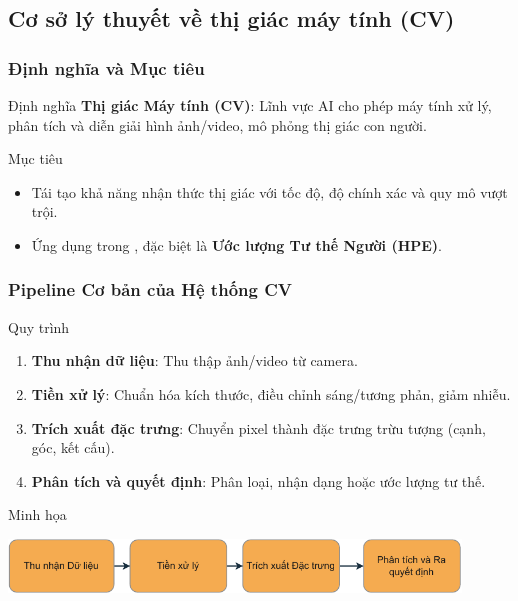 \subsection{Cơ sở lý thuyết về thị giác máy tính (CV)}
\begin{frame}
\frametitle{Định nghĩa và Mục tiêu}
\begin{block}{Định nghĩa}
\textbf{Thị giác Máy tính (CV)}: Lĩnh vực AI cho phép máy tính xử lý, phân tích và diễn giải hình ảnh/video, mô phỏng thị giác con người.
\end{block}

\begin{block}{Mục tiêu}
\begin{itemize}
\item Tái tạo khả năng nhận thức thị giác với tốc độ, độ chính xác và quy mô vượt trội.
\item Ứng dụng trong \TENLUANVAN, đặc biệt là \textbf{Ước lượng Tư thế Người (HPE)}.
\end{itemize}
\end{block}
\end{frame}

\begin{frame}
\frametitle{Pipeline Cơ bản của Hệ thống CV}
\begin{block}{Quy trình}
\begin{enumerate}
\item \textbf{Thu nhận dữ liệu}: Thu thập ảnh/video từ camera.
\item \textbf{Tiền xử lý}: Chuẩn hóa kích thước, điều chỉnh sáng/tương phản, giảm nhiễu.
\item \textbf{Trích xuất đặc trưng}: Chuyển pixel thành đặc trưng trừu tượng (cạnh, góc, kết cấu).
\item \textbf{Phân tích và quyết định}: Phân loại, nhận dạng hoặc ước lượng tư thế.
\end{enumerate}
\end{block}

\begin{exampleblock}{Minh họa}
\begin{center}
\includegraphics[width=0.9\textwidth]{images/vision_flow-crop.pdf}
\caption{Quy trình tổng thể của hệ thống CV.}
\label{fig:cv_pipeline}
\end{center}
\end{exampleblock}
\end{frame}


